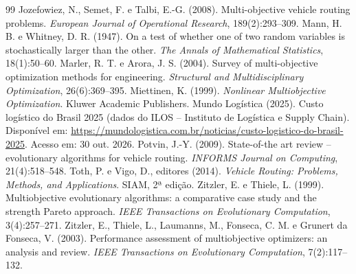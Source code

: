 \documentclass[a4paper,12pt]{article}
\begin{document}
\begin{thebibliography}{99}
Jozefowiez, N., Semet, F. e Talbi, E.-G. (2008). Multi-objective vehicle routing problems. \emph{European Journal of Operational Research}, 189(2):293--309.
Mann, H. B. e Whitney, D. R. (1947). On a test of whether one of two random variables is stochastically larger than the other. \emph{The Annals of Mathematical Statistics}, 18(1):50--60.
Marler, R. T. e Arora, J. S. (2004). Survey of multi-objective optimization methods for engineering. \emph{Structural and Multidisciplinary Optimization}, 26(6):369--395.
Miettinen, K. (1999). \emph{Nonlinear Multiobjective Optimization}. Kluwer Academic Publishers.
Mundo Logística (2025). Custo logístico do Brasil 2025 (dados do ILOS -- Instituto de Logística e Supply Chain). Disponível em: \url{https://mundologistica.com.br/noticias/custo-logistico-do-brasil-2025}. Acesso em: 30 out. 2026.
Potvin, J.-Y. (2009). State-of-the art review -- evolutionary algorithms for vehicle routing. \emph{INFORMS Journal on Computing}, 21(4):518--548.
Toth, P. e Vigo, D., editores (2014). \emph{Vehicle Routing: Problems, Methods, and Applications}. SIAM, 2ª edição.
Zitzler, E. e Thiele, L. (1999). Multiobjective evolutionary algorithms: a comparative case study and the strength Pareto approach. \emph{IEEE Transactions on Evolutionary Computation}, 3(4):257--271.
Zitzler, E., Thiele, L., Laumanns, M., Fonseca, C. M. e Grunert da Fonseca, V. (2003). Performance assessment of multiobjective optimizers: an analysis and review. \emph{IEEE Transactions on Evolutionary Computation}, 7(2):117--132.
\end{thebibliography}
\end{document}
